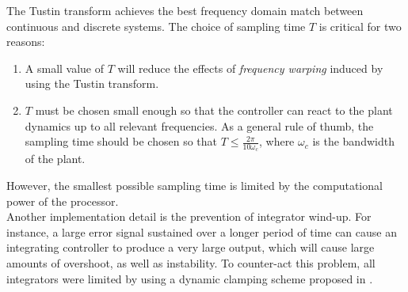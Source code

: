 The Tustin transform achieves the best frequency domain match between continuous and discrete systems. The choice of sampling time $T$ is critical for two reasons:

\begin{enumerate}
\item{A small value of $T$ will reduce the effects of \textit{frequency warping} induced by using the Tustin transform.}
\item{$T$ must be chosen small enough so that the controller can react to the plant dynamics up to all relevant frequencies. As a general rule of thumb, the sampling time should be chosen so that $T \leq \frac{2 \pi}{10 \omega_c}$, where $\omega_c$ is the bandwidth of the plant.}
\end{enumerate}

However, the smallest possible sampling time is limited by the computational power of the processor. \\

Another implementation detail is the prevention of integrator wind-up. For instance, a large error signal sustained over a longer period of time can cause an integrating controller to produce a very large output, which will cause large amounts of overshoot, as well as instability. To counter-act this problem, all integrators were limited by using a dynamic clamping scheme proposed in \cite{antiwindup}.